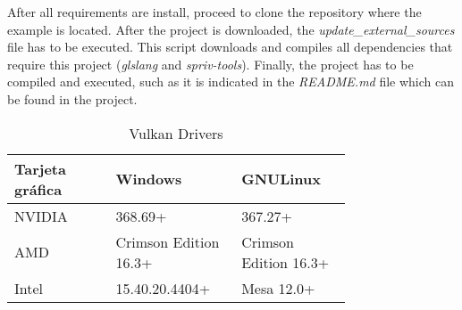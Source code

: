 After all requirements are install, proceed to clone the repository where the example is located. After the project
is downloaded, the \emph{update\_external\_sources} file has to be executed. This script downloads and compiles
all dependencies that require this project (\emph{glslang} and \emph{spriv-tools}). Finally, the project has to be
compiled and executed, such as it is indicated in the \emph{README.md} file which can be found in the project.

\begin{table*}[t]
  \centering
  \begin{tabular}{p{0.25\linewidth}p{0.25\linewidth}p{0.25\linewidth}}
    \toprule
    Tarjeta gráfica & Windows    & GNU\/Linux \\
    \midrule
    NVIDIA          & 368.69+                   & 367.27+ \\
    AMD             & Crimson Edition 16.3+     & Crimson Edition 16.3+ \\
    Intel           & 15.40.20.4404+            & Mesa 12.0+ \\
    \bottomrule
  \end{tabular}
  \caption{Vulkan Drivers}
  \label{tab:vulkan_drivers}
\end{table*}
